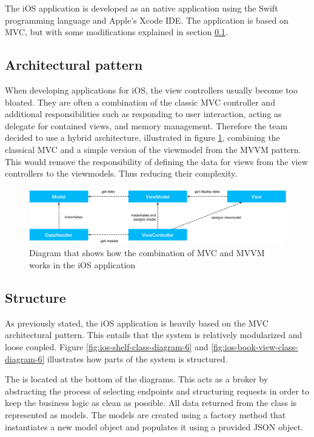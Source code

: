 The iOS application is developed as an native application using the Swift programming language and Apple's Xcode \gls{IDE}.\cite{xcode} The application is based on \gls{MVC}, but with some modifications explained in section \ref{ios-architectural-pattern}.

\subsection{Architectural pattern}
\label{ios-architectural-pattern}
When developing applications for iOS, the view controllers usually become too bloated.\cite{mega-view-controller} They are often a combination of the classic \gls{MVC} controller and additional responsibilities such as responding to user interaction, acting as delegate for contained views, and memory management. Therefore the team decided to use a hybrid architecture, illustrated in figure \ref{fig:ios-mvc-mvvc-model-6}, combining the classical \gls{MVC} and a simple version of the viewmodel from the \gls{MVVM} pattern.\cite{MVVM} This would remove the responsibility of defining the data for views from the view controllers to the viewmodels. Thus reducing their complexity.

\begin{figure}
    \includegraphics[width=\textwidth,keepaspectratio,origin=c]{figs/v06/iOS/mvc-mvvm-model.png}
    \caption{Diagram that shows how the combination of \gls{MVC} and \gls{MVVM} works in the iOS application}
    \label{fig:ios-mvc-mvvc-model-6}
\end{figure}

\subsection{Structure}
As previously stated, the iOS application is heavily based on the \gls{MVC} architectural pattern. This entails that the system is relatively modularized and loose coupled. Figure \ref{fig:ios-shelf-class-diagram-6} and \ref{fig:ios-book-view-class-diagram-6}  illustrates how parts of the system is structured. 

The  is located at the bottom of the diagrams. This acts as a broker by abstracting the process of selecting endpoints and structuring requests in order to keep the business logic as clean as possible.\cite{progark} All data returned from the  class is represented as models. The models are created using a factory method that instantiates a new model object and populates it using a provided \gls{JSON} object.\cite{progark}

